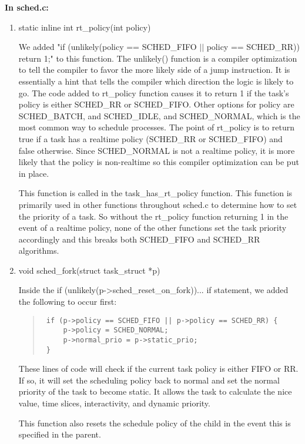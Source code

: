 \documentclass[letterpaper,10pt,titlepage]{article}
\begin{document}
{\bfseries In sched.c:}
\begin{enumerate}
    \item static inline int rt\_policy(int policy)

        We added "if (unlikely(policy == SCHED\_FIFO $||$ policy == SCHED\_RR)) return 1;" to this function. The unlikely() function is a compiler optimization to tell the compiler to favor the more likely side of a jump instruction. It is essentially a hint that tells the compiler which direction the logic is likely to go. The code added to rt\_policy function causes it to return 1 if the task's policy is either SCHED\_RR or SCHED\_FIFO. Other options for policy are SCHED\_BATCH, and SCHED\_IDLE, and SCHED\_NORMAL, which is the most common way to schedule processes. The point of rt\_policy is to return true if a task has a realtime policy (SCHED\_RR or SCHED\_FIFO) and false otherwise. Since SCHED\_NORMAL is not a realtime policy, it is more likely that the policy is non-realtime so this compiler optimization can be put in place. 
        
        This function is called in the task\_has\_rt\_policy function. This function is primarily used in other functions throughout sched.c to determine how to set the priority of a task. So without the rt\_policy function returning 1 in the event of a realtime policy, none of the other functions set the task priority accordingly and this breaks both SCHED\_FIFO and SCHED\_RR algorithms.


\item void sched\_fork(struct task\_struct *p)

Inside the if (unlikely(p->sched\_reset\_on\_fork)){...} if statement, we added the following to occur first:
\begin{quotation}
\begin{lstlisting}
 if (p->policy == SCHED_FIFO || p->policy == SCHED_RR) {
     p->policy = SCHED_NORMAL;
     p->normal_prio = p->static_prio;
 }
\end{lstlisting}
\end{quotation}
These lines of code will check if the current task policy is either FIFO or RR. If so, it will set the scheduling policy back to normal and set the normal priority of the task to become static. It allows the task to calculate the nice value, time slices, interactivity, and dynamic priority.

This function also resets the schedule policy of the child in the event this is specified in the parent.



\end{enumerate}
\end{document}
